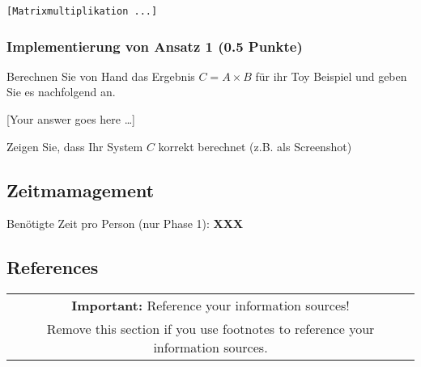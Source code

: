 \documentclass[11pt]{scrartcl}
\newcommand{\youranswerhere}{[Your answer goes here \ldots]}
\begin{document}
\begin{lstlisting}[style=dmrJava]
[Matrixmultiplikation ...]
\end{lstlisting}


\subsubsection*{Implementierung von Ansatz 1 (0.5 Punkte)}
Berechnen Sie von Hand das Ergebnis $C = A \times B$ für ihr Toy Beispiel und geben Sie es nachfolgend an.

\youranswerhere{}

Zeigen Sie, dass Ihr System $C$ korrekt berechnet (z.B. als Screenshot)

\subsection*{Zeitmamagement}

Benötigte Zeit pro Person (nur Phase 1): \textbf{XXX}

\subsection*{References}

\begin{table}[H]
  \centering
  \begin{tabular}{c}
    \hline
    \textbf{Important:} Reference your information sources! \tabularnewline
    Remove this section if you use footnotes to reference your information sources. \tabularnewline
    \hline
  \end{tabular}
\end{table}
\end{document}
